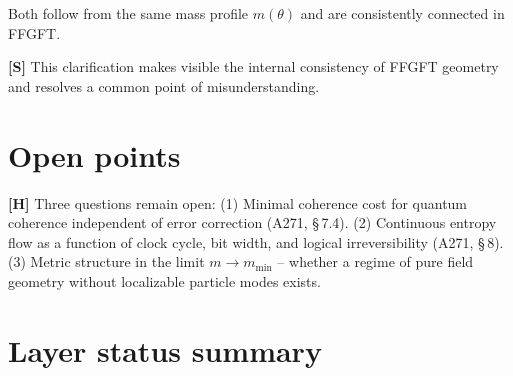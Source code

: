 Both follow from the same mass profile $m(\theta)$ and are consistently
connected in FFGFT.

\textbf{[S]} This clarification makes visible the internal consistency
of FFGFT geometry and resolves a common point of misunderstanding.

\section{Open points}

\textbf{[H]} Three questions remain open:
(1) Minimal coherence cost for quantum coherence independent of
error correction (A271, \S\,7.4).
(2) Continuous entropy flow as a function of clock cycle, bit width,
and logical irreversibility (A271, \S\,8).
(3) Metric structure in the limit $m \to m_\text{min}$ -- whether
a regime of pure field geometry without localizable particle modes
exists.

\section{Layer status summary}

